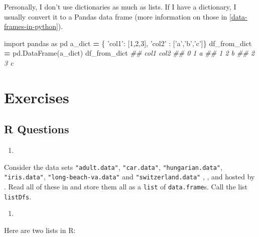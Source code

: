 \documentclass[12pt,krantz2]{krantz}
\makeatletter
\newenvironment{Shaded}{\begin{snugshade}}{\end{snugshade}}
\newcommand{\CommentTok}[1]{\textcolor[rgb]{0.37,0.37,0.37}{\textit{#1}}}
\newcommand{\DecValTok}[1]{\textcolor[rgb]{0.06,0.06,0.06}{#1}}
\newcommand{\ImportTok}[1]{#1}
\newcommand{\NormalTok}[1]{#1}
\newcommand{\OperatorTok}[1]{\textcolor[rgb]{0.43,0.43,0.43}{\textbf{#1}}}
\newcommand{\StringTok}[1]{\textcolor[rgb]{0.5,0.5,0.5}{#1}}
\newenvironment{kframe}{%
\medskip{}
\setlength{\fboxsep}{.8em}
 \def\at@end@of@kframe{}%
 \ifinner\ifhmode%
  \def\at@end@of@kframe{\end{minipage}}%
  \begin{minipage}{\columnwidth}%
 \fi\fi%
 \def\FrameCommand##1{\hskip\@totalleftmargin \hskip-\fboxsep
 \colorbox{shadecolor}{##1}\hskip-\fboxsep
     \hskip-\linewidth \hskip-\@totalleftmargin \hskip\columnwidth}%
 \MakeFramed {\advance\hsize-\width
   \@totalleftmargin\z@ \linewidth\hsize
   \@setminipage}}%
 {\par\unskip\endMakeFramed%
 \at@end@of@kframe}
\renewenvironment{Shaded}{\begin{kframe}}{\end{kframe}}
\makeatother
\begin{document}
Personally, I don't use dictionaries as much as lists. If I have a dictionary, I usually convert it to a Pandas data frame (more information on those in \ref{data-frames-in-python}).

\begin{Shaded}
\begin{Highlighting}[]
\ImportTok{import}\NormalTok{ pandas }\ImportTok{as}\NormalTok{ pd}
\NormalTok{a_dict }\OperatorTok{=}\NormalTok{ \{ }\StringTok{'col1'}\NormalTok{: [}\DecValTok{1}\NormalTok{,}\DecValTok{2}\NormalTok{,}\DecValTok{3}\NormalTok{], }\StringTok{'col2'}\NormalTok{ : [}\StringTok{'a'}\NormalTok{,}\StringTok{'b'}\NormalTok{,}\StringTok{'c'}\NormalTok{]\}}
\NormalTok{df_from_dict }\OperatorTok{=}\NormalTok{ pd.DataFrame(a_dict)}
\NormalTok{df_from_dict}
\CommentTok{##    col1 col2}
\CommentTok{## 0     1    a}
\CommentTok{## 1     2    b}
\CommentTok{## 2     3    c}
\end{Highlighting}
\end{Shaded}

\hypertarget{exercises-3}{%
\section{Exercises}\label{exercises-3}}

\hypertarget{r-questions-3}{%
\subsection{R Questions}\label{r-questions-3}}

\begin{enumerate}
\def\labelenumi{\arabic{enumi}.}
\item
\end{enumerate}

Consider the data sets \texttt{"adult.data"}, \texttt{"car.data"}, \texttt{"hungarian.data"}, \texttt{"iris.data"}, \texttt{"long-beach-va.data"} and \texttt{"switzerland.data"} \citep{misc_heart_disease_45}, \citep{misc_iris_53}, \citep{misc_adult_2} and \citep{misc_car_evaluation_19} hosted by \citep{uci_data}. Read all of these in and store them all as a \texttt{list} of \texttt{data.frame}s. Call the list \texttt{listDfs}.

\begin{enumerate}
\def\labelenumi{\arabic{enumi}.}
\setcounter{enumi}{1}
\item
\end{enumerate}

Here are two lists in R:
\end{document}
